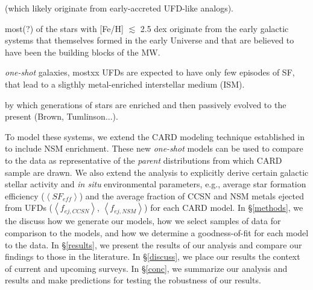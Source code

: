 (which likely originate from early-accreted UFD-like analogs). 

most(?) of the stars with [Fe/H] $\lesssim$ 2.5 dex originate from the early galactic systems that themselves formed in the early Universe and that are believed to have been the building blocks of the MW.


{\it one-shot} galaxies, mostxx UFDs are expected to have only few episodes of SF, 
that lead to a sligthly metal-enriched interstellar medium (ISM).

by which generations of stars are enriched and then passively evolved to the present (Brown, Tumlinson...). 

To model these systems, we extend the CARD modeling technique established in \citet{Lee_2013} to include NSM enrichment. These new {\it one-shot} models can be used to compare to the data as representative of the {\it parent} distributions from which CARD sample are drawn. We also extend the \citet{Lee_2013} analysis to explicitly derive certain galactic stellar activity and {\it in situ} environmental parameters, e.g., average star formation efficiency ($\left<SF_{eff}\right>$) and the average fraction of CCSN and NSM metals ejected from UFDs ($\left<f_{ej,CCSN}\right>$, $\left<f_{ej,NSM}\right>$) for each CARD model. In \S\ref{methods}, we the discuss how we generate our models, how we select samples of data for comparison to the models, and how we determine a goodness-of-fit for each model to the data. In \S\ref{results}, we present the results of our analysis and compare our findings to those in the literature. In \S\ref{discuss}, we place our results the context of current and upcoming surveys. In \S\ref{conc}, we summarize our analysis and results and make predictions for testing the robustness of our results.
